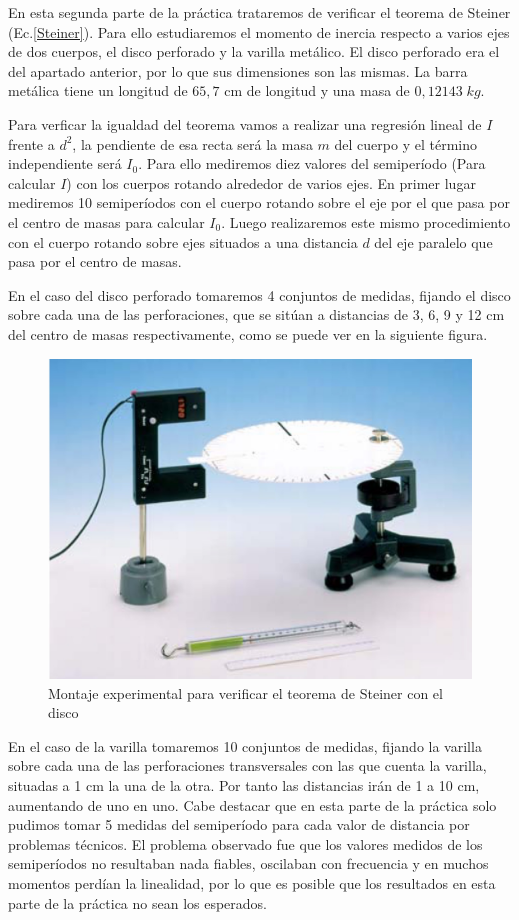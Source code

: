 \documentclass[a4paper,12pt,titlepage]{report}
\begin{document}
En esta segunda parte de la práctica trataremos de verificar el teorema de Steiner (Ec.\ref{Steiner}). Para ello estudiaremos el momento de inercia respecto a varios ejes de dos cuerpos, el disco perforado y la varilla metálico. El disco perforado era el del apartado anterior, por lo que sus dimensiones son las mismas. La barra metálica tiene un longitud de $65,7$ cm de longitud y una masa de $0,12143 \; kg$.

\par Para verficar la igualdad del teorema vamos a realizar una regresión lineal de $I$ frente a $d^2$, la pendiente de esa recta será la masa $m$ del cuerpo y el término independiente será $I_0$. Para ello mediremos diez valores del semiperíodo (Para calcular $I$) con los cuerpos rotando alrededor de varios ejes. En primer lugar mediremos 10 semiperíodos con el cuerpo rotando sobre el eje por el que pasa por el centro de masas para calcular $I_0$. Luego realizaremos este mismo procedimiento con el cuerpo rotando sobre ejes situados a una distancia $d$ del eje paralelo que pasa por el centro de masas.

\par En el caso del disco perforado tomaremos 4 conjuntos de medidas, fijando el disco sobre cada una de las perforaciones, que se sitúan a distancias de 3, 6, 9 y 12 cm del centro de masas respectivamente, como se puede ver en la siguiente figura.

\begin{figure}[h!]
    \centering
    \includegraphics[width=0.65\linewidth]{Images/Material MI 2.jpeg}
    \caption{Montaje experimental para verificar el teorema de Steiner con el disco}
\end{figure}



\par En el caso de la varilla tomaremos 10 conjuntos de medidas, fijando la varilla sobre cada una de las perforaciones transversales con las que cuenta la varilla, situadas a 1 cm la una de la otra. Por tanto las distancias irán de 1 a 10 cm, aumentando de uno en uno. Cabe destacar que en esta parte de la práctica solo pudimos tomar 5 medidas del semiperíodo para cada valor de distancia por problemas técnicos. El problema observado fue que los valores medidos de los semiperíodos no resultaban nada fiables, oscilaban con frecuencia y en muchos momentos perdían la linealidad, por lo que es posible que los resultados en esta parte de la práctica no sean los esperados.
\end{document}
